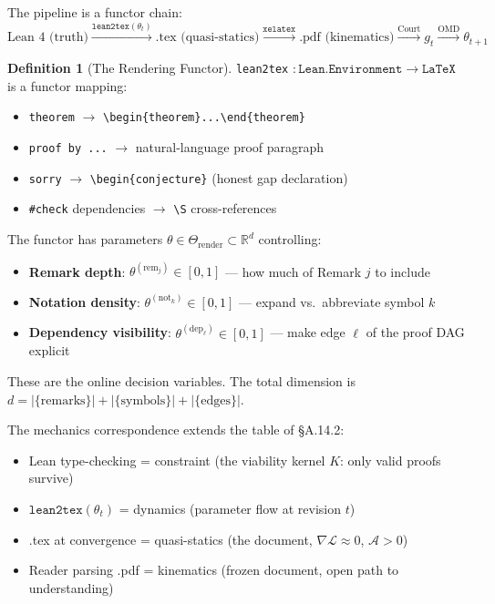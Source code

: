 \documentclass[11pt,a4paper]{article}
\newtheorem{theorem}{Theorem}[section]
\theoremstyle{definition}
\newtheorem{definition}[theorem]{Definition}
\theoremstyle{remark}
\begin{document}
The pipeline is a functor chain:
\[
  \text{Lean 4 (truth)} \xrightarrow{\texttt{lean2tex}(\theta_t)} \text{.tex (quasi-statics)} \xrightarrow{\texttt{xelatex}} \text{.pdf (kinematics)} \xrightarrow{\text{Court}} g_t \xrightarrow{\text{OMD}} \theta_{t+1}
\]

\begin{definition}[The Rendering Functor]\label{def:lean2tex}
\texttt{lean2tex} $: \texttt{Lean.Environment} \to \texttt{LaTeX}$ is a functor mapping:
\begin{itemize}[nosep]
  \item \texttt{theorem} $\to$ \verb|\begin{theorem}...\end{theorem}|
  \item \texttt{proof by ...} $\to$ natural-language proof paragraph
  \item \texttt{sorry} $\to$ \verb|\begin{conjecture}| \quad (honest gap declaration)
  \item \texttt{\#check} dependencies $\to$ \verb|\S| cross-references
\end{itemize}
The functor has parameters $\theta \in \Theta_{\mathrm{render}} \subset \mathbb{R}^d$ controlling:
\begin{itemize}[nosep]
  \item[(i)] \textbf{Remark depth}: $\theta^{(\mathrm{rem}_j)} \in [0,1]$ --- how much of Remark $j$ to include
  \item[(ii)] \textbf{Notation density}: $\theta^{(\mathrm{not}_k)} \in [0,1]$ --- expand vs.\ abbreviate symbol $k$
  \item[(iii)] \textbf{Dependency visibility}: $\theta^{(\mathrm{dep}_\ell)} \in [0,1]$ --- make edge $\ell$ of the proof DAG explicit
\end{itemize}
These are the online decision variables. The total dimension is $d = |\{\text{remarks}\}| + |\{\text{symbols}\}| + |\{\text{edges}\}|$.
\end{definition}

The mechanics correspondence extends the table of \S A.14.2:
\begin{itemize}[nosep]
  \item Lean type-checking = constraint (the viability kernel $K$: only valid proofs survive)
  \item $\texttt{lean2tex}(\theta_t)$ = dynamics (parameter flow at revision $t$)
  \item .tex at convergence = quasi-statics (the document, $\nabla \mathcal{L} \approx 0$, $\mathcal{A} > 0$)
  \item Reader parsing .pdf = kinematics (frozen document, open path to understanding)
\end{itemize}
\end{document}

